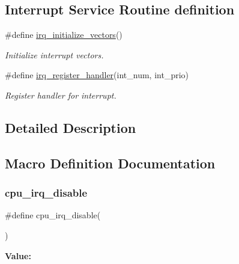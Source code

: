 \subsection*{Interrupt Service Routine definition}
\begin{DoxyCompactItemize}
\item 
\#define \mbox{\hyperlink{group__interrupt__group_ga931b667f6490ad3d8905fa25bebb24b1}{irq\+\_\+initialize\+\_\+vectors}}()
\begin{DoxyCompactList}\small\item\em Initialize interrupt vectors. \end{DoxyCompactList}\item 
\#define \mbox{\hyperlink{group__interrupt__group_gaa746642b1132af054826fb169f541965}{irq\+\_\+register\+\_\+handler}}(int\+\_\+num,  int\+\_\+prio)
\begin{DoxyCompactList}\small\item\em Register handler for interrupt. \end{DoxyCompactList}\end{DoxyCompactItemize}


\subsection{Detailed Description}


\subsection{Macro Definition Documentation}
\mbox{\label{group__interrupt__group_ga7b77391ed86e2e027f9ee1dd99a06980}} 
\subsubsection{\texorpdfstring{cpu\_irq\_disable}{cpu\_irq\_disable}}
{\footnotesize\ttfamily \#define cpu\+\_\+irq\+\_\+disable(\begin{DoxyParamCaption}{ }\end{DoxyParamCaption})}

{\bfseries Value\+:}
\begin{DoxyCode}{0}
\DoxyCodeLine{\textcolor{keywordflow}{do} \{                                       \(\backslash\)}
\DoxyCodeLine{        \textcolor{comment}{/*g\_interrupt\_enabled = false; */}          \(\backslash\)}

\end{DoxyCode}
\mbox{\label{group__interrupt__group_gae4922a4bd8ba4150211fbc7f2302403c}} 
